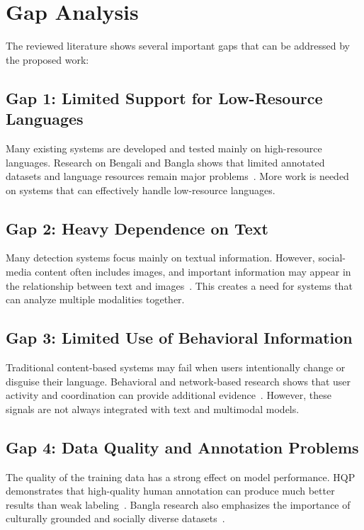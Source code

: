 \section{Gap Analysis}
The reviewed literature shows several important gaps that can be addressed by the
proposed work:

\subsection{Gap 1: Limited Support for Low-Resource Languages}
Many existing systems are developed and tested mainly on high-resource languages.
Research on Bengali and Bangla shows that limited annotated datasets and language
resources remain major problems~\cite{lora2023,hasan2026,romim2022}. More work is
needed on systems that can effectively handle low-resource languages.

\subsection{Gap 2: Heavy Dependence on Text}
Many detection systems focus mainly on textual information. However, social-media
content often includes images, and important information may appear in the
relationship between text and images~\cite{lin2024,hee2022}. This creates a need
for systems that can analyze multiple modalities together.

\subsection{Gap 3: Limited Use of Behavioral Information}
Traditional content-based systems may fail when users intentionally change or
disguise their language. Behavioral and network-based research shows that user
activity and coordination can provide additional
evidence~\cite{declerck2024,sela2025,schneider2026}. However, these signals are not
always integrated with text and multimodal models.

\subsection{Gap 4: Data Quality and Annotation Problems}
The quality of the training data has a strong effect on model performance. HQP
demonstrates that high-quality human annotation can produce much better results
than weak labeling~\cite{maarouf2024}. Bangla research also emphasizes the
importance of culturally grounded and socially diverse
datasets~\cite{hasan2026,romim2022}.

